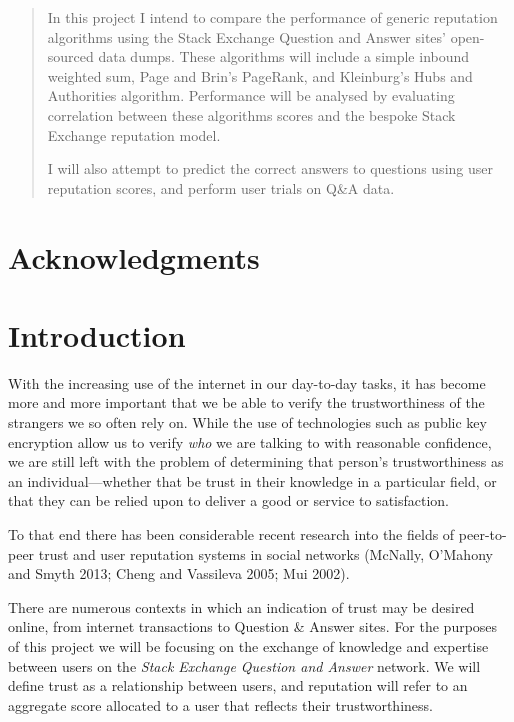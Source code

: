 \documentclass[]{final_report}
\begin{document}
\begin{abstract}

In this project I intend to compare the performance of generic reputation algorithms using the Stack Exchange Question and Answer sites' open-sourced data dumps. These algorithms will include a simple inbound weighted sum, Page and Brin's PageRank, and Kleinburg's Hubs and Authorities algorithm. Performance will be analysed by evaluating correlation between these algorithms scores and the bespoke Stack Exchange reputation model.

I will also attempt to predict the correct answers to questions using user reputation scores, and perform user trials on Q\&A data.

\end{abstract}
\newpage

\chapter*{Acknowledgments}


\chapter{Introduction}

With the increasing use of the internet in our day-to-day tasks, it has become more and more important that we be able to verify the trustworthiness of the strangers we so often rely on. While the use of technologies such as public key encryption allow us to verify \textsl{who} we are talking to with reasonable confidence, we are still left with the problem of determining that person's trustworthiness as an individual---whether that be trust in their knowledge in a particular field, or that they can be relied upon to deliver a good or service to satisfaction.

To that end there has been considerable recent research into the fields of peer-to-peer trust and user reputation systems in social networks (McNally, O'Mahony and Smyth 2013; Cheng and Vassileva 2005; Mui 2002).

There are numerous contexts in which an indication of trust may be desired online, from internet transactions to Question \& Answer sites. For the purposes of this project we will be focusing on the exchange of knowledge and expertise between users on the \textsl{Stack Exchange Question and Answer} network. We will define trust as a relationship between users, and reputation will refer to an aggregate score allocated to a user that reflects their trustworthiness.
\end{document}

